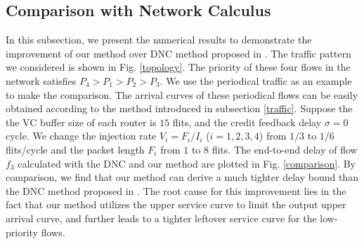 \documentclass[preprint]{elsarticle}
\begin{document}
\subsection{Comparison with Network Calculus}\label{dnccmp}
In this subsection, we present the numerical results to demonstrate the improvement of our method over DNC method proposed in \cite{Qian489900}. The traffic pattern we considered is shown in Fig. \ref{topology}. The priority of these four flows in the network satisfies $P_4>P_1>P_2>P_3$. We use the periodical traffic as an example to make the comparison. The arrival curves of these periodical flows can be easily obtained according to the method introduced in subsection \ref{traffic}. Suppose the the VC buffer size of each router is $15$ flits, and the credit feedback delay $\sigma=0$ cycle. We change the injection rate $V_i=F_i/I_i$ ($i=1,2,3,4$) from $1/3$ to $1/6$ flits/cycle and the packet length $F_i$ from $1$ to $8$ flits. The end-to-end delay of flow $f_3$ calculated with the DNC and our method are plotted in Fig. \ref{comparison}. By comparison, we find that our method can derive a much tighter delay bound than the DNC method proposed in \cite{Qian489900}. The root cause for this improvement lies in the fact that our method utilizes the upper service curve to limit the output upper arrival curve, and further leads to a tighter leftover service curve for the low-priority flows.
\end{document}

